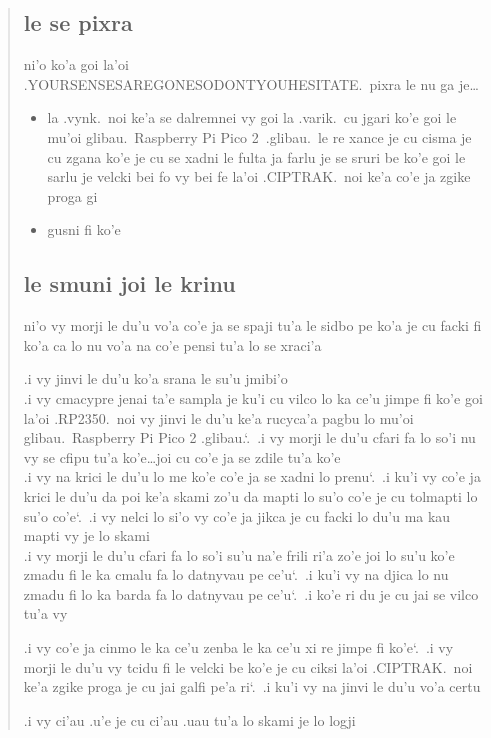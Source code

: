 \documentclass{report}
\newcommand\sds{\spacefactor\sfcode`.\ \space}
\begin{document}
\begin{quote}
	\subsection{le se pixra}
		ni'o ko'a goi la'oi .YOURSENSESAREGONESODONTYOUHESITATE.\ pixra le nu ga je\ldots
		\begin{itemize}
			\item la .vynk.\ noi ke'a se dalremnei vy goi la .varik.\ cu jgari ko'e goi le mu'oi glibau.\ Raspberry Pi Pico 2\ .glibau.\ le re xance je cu cisma je cu zgana ko'e je cu se xadni le fulta ja farlu je se sruri be ko'e goi le sarlu je velcki bei fo vy bei fe la'oi .CIPTRAK.\ noi ke'a co'e ja zgike proga gi
			\item gusni fi ko'e
		\end{itemize}

	\subsection{le smuni joi le krinu}
		ni'o vy morji le du'u vo'a co'e ja se spaji tu'a le sidbo pe ko'a je cu facki fi ko'a ca lo nu vo'a na co'e pensi tu'a lo se xraci'a

		.i vy jinvi le du'u ko'a srana le su'u jmibi'o \\
		.i vy cmacypre jenai ta'e sampla je ku'i cu vilco lo ka ce'u jimpe fi ko'e goi la'oi .RP2350.\ noi vy jinvi le du'u ke'a rucyca'a pagbu lo mu'oi glibau.\ Raspberry Pi Pico 2 .glibau.\sds  .i vy morji le du'u cfari fa lo so'i nu vy se cfipu tu'a ko'e\ldots joi cu co'e ja se zdile tu'a ko'e \\
		.i vy na krici le du'u lo me ko'e co'e ja se xadni lo prenu\sds  .i ku'i vy co'e ja krici le du'u da poi ke'a skami zo'u da mapti lo su'o co'e je cu tolmapti lo su'o co'e\sds  .i vy nelci lo si'o vy co'e ja jikca je cu facki lo du'u ma kau mapti vy je lo skami \\
		.i vy morji le du'u cfari fa lo so'i su'u na'e frili ri'a zo'e joi lo su'u ko'e zmadu fi le ka cmalu fa lo datnyvau pe ce'u\sds  .i ku'i vy na djica lo nu zmadu fi lo ka barda fa lo datnyvau pe ce'u\sds  .i ko'e ri du je cu jai se vilco tu'a vy

		.i vy co'e ja cinmo le ka ce'u zenba le ka ce'u xi re jimpe fi ko'e\sds  .i vy morji le du'u vy tcidu fi le velcki be ko'e je cu ciksi la'oi .CIPTRAK.\ noi ke'a zgike proga je cu jai galfi pe'a ri\sds  .i ku'i vy na jinvi le du'u vo'a certu

		.i vy ci'au .u'e je cu ci'au .uau tu'a lo skami je lo logji


\end{quote}
\end{document}

